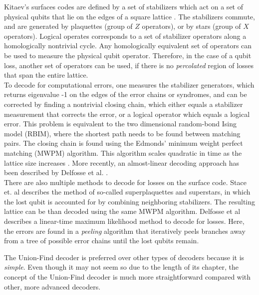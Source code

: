 Kitaev's surfaces codes are defined by a set of stabilizers which act on a set of physical qubits that lie on the edges of a square lattice \cite{kitaev}. The stabilizers commute, and are generated by plaquettes (group of $Z$ operators), or by stars (group of $X$ operators). Logical operates corresponds to a set of stabilizer operators along a homologically nontrivial cycle. Any homologically equivalent set of operators can be used to measure the physical qubit operator. Therefore, in the case of a qubit loss, another set of operators can be used, if there is no \emph{percolated} region of losses that span the entire lattice. \\

To decode for computational errors, one measures the stabilizer generators, which returns eigenvalue -1 on the edges of the error chains or syndromes, and can be corrected by finding a nontrivial closing chain, which either equals a stabilizer measurement that corrects the error, or a logical operator which equals a logical error. This problem is equivalent to the two dimensional random-bond Ising model (RBIM), where the shortest path needs to be found between matching pairs. The closing chain is found using the Edmonds' minimum weight perfect matching (MWPM) algorithm. This algorithm scales quadratic in time as the lattice size increases \cite{stace2009}. More recently, an almost-linear decoding approach has been described by Delfosse et al. \cite{nickerson2017}. \\

There are also multiple methods to decode for losses on the surface code. Stace et. al \cite{stace2009,stace2010} describes the method of so-called superplaquettes and superstars, in which the lost qubit is accounted for by combining neighboring stabilizers. The resulting lattice can be than decoded using the same MWPM algorithm. Delfosse et al \cite{delfosse2017} describes a linear-time maximum likelihood method to decode for losses. Here, the errors are found in a \emph{peeling} algorithm that iteratively peels branches away from a tree of possible error chains until the lost qubits remain.



The Union-Find decoder is preferred over other types of decoders because it is \emph{simple}. Even though it may not seem so due to the length of its chapter, the concept of the Union-Find decoder is much more straightforward compared with other, more advanced decoders. 